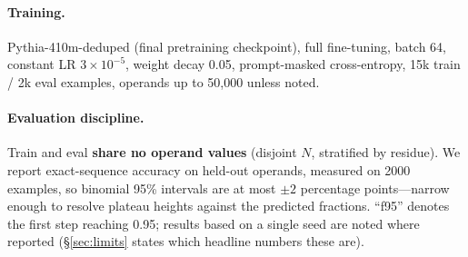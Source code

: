\documentclass{article} %
\begin{document}
\begin{table}[h]
\centering
{}
\caption{The task cells. Every cell supervises residue extraction; only the dressing differs.}
\label{tab:cells}
\end{table}

\paragraph{Training.} Pythia-410m-deduped \citep{biderman2023pythia} (final pretraining checkpoint), full fine-tuning, batch 64, constant LR $3\times10^{-5}$, weight decay 0.05, prompt-masked cross-entropy, 15k train / 2k eval examples, operands up to 50{,}000 unless noted.
\paragraph{Evaluation discipline.} Train and eval \textbf{share no operand values} (disjoint $N$, stratified by residue). We report exact-sequence accuracy on held-out operands, measured on 2000 examples, so binomial 95\% intervals are at most $\pm 2$ percentage points---narrow enough to resolve plateau heights against the predicted fractions. ``f95'' denotes the first step reaching 0.95; results based on a single seed are noted where reported (\S\ref{sec:limits} states which headline numbers these are).
\end{document}
